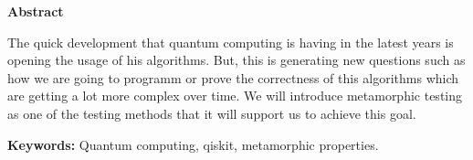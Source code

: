 \newpage

\thispagestyle{empty}

\begin{center}

{\bf \Huge Abstract}

  \end{center}
\vspace{1cm}

The quick development that quantum computing is having in the latest years is opening the usage of his algorithms. But, this is generating new questions such as how we are going to programm or prove the correctness of this algorithms which are getting a lot more complex over time. We will introduce metamorphic testing as one of the testing methods that it will support us to achieve this goal. 
\vspace{2cm}

\textbf{Keywords:} Quantum computing, qiskit, metamorphic properties.